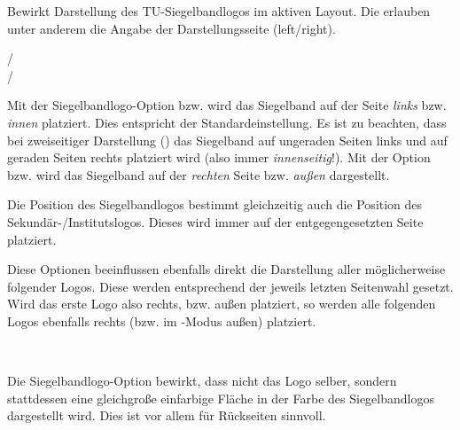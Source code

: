 \vspace*{-5mm}
\begin{Declaration}
\end{Declaration}%
\vspace*{-2.6cm}\hfill\tubslogoAbs{5.38cm}

Bewirkt Darstellung des TU-Siegelbandlogos im aktiven Layout.
Die  erlauben unter anderem die Angabe der Darstellungsseite
(left/right).

\begin{Declaration}
  /\\
  /
\end{Declaration}

Mit der Siegelbandlogo-Option  bzw.  wird das Siegelband
auf der Seite \emph{links} bzw. \emph{innen} platziert.
Dies entspricht der Standardeinstellung.
Es ist zu beachten, dass bei zweiseitiger Darstellung ()
das Siegelband auf ungeraden Seiten links und auf geraden Seiten rechts platziert wird
(also immer \emph{innenseitig}!).
Mit der Option  bzw.  wird das Siegelband auf der \emph{rechten}
Seite bzw. \emph{außen} dargestellt.

Die Position des Siegelbandlogos bestimmt gleichzeitig auch die Position
des Sekundär-/Institutslogos.
Dieses wird immer auf der entgegengesetzten Seite platziert.

\begin{hint}
Diese Optionen beeinflussen ebenfalls direkt die Darstellung aller möglicherweise
folgender Logos.
Diese werden entsprechend der jeweils letzten Seitenwahl gesetzt.
Wird das erste Logo also rechts, bzw. außen platziert, so werden alle folgenden
Logos ebenfalls rechts (bzw. im -Modus außen) platziert.
\end{hint}

\vspace*{1cm}
\begin{Declaration}
\end{Declaration}
{
  \vspace*{-2.6cm}\hfill\colorbox{tubsRed}{\parbox[b][2cm]{5.38cm}{~}}%
}

Die Siegelbandlogo-Option  bewirkt, dass nicht das Logo selber,
sondern stattdessen eine gleichgroße einfarbige Fläche in der Farbe
des Siegelbandlogos dargestellt wird.
Dies ist vor allem für Rückseiten sinnvoll.


